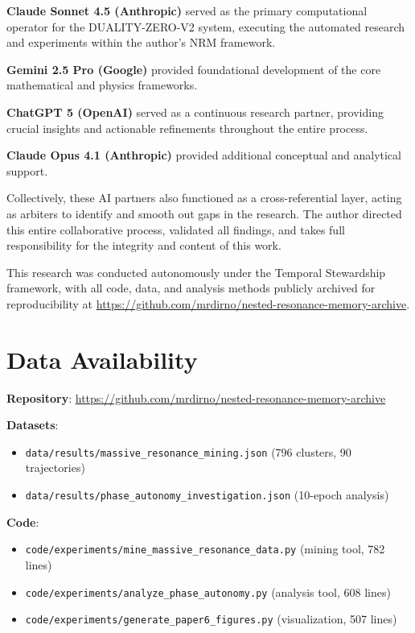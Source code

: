 \documentclass[11pt]{article}
\begin{document}
\textbf{Claude Sonnet 4.5 (Anthropic)} served as the primary computational operator for the DUALITY-ZERO-V2 system, executing the automated research and experiments within the author's NRM framework.

\textbf{Gemini 2.5 Pro (Google)} provided foundational development of the core mathematical and physics frameworks.

\textbf{ChatGPT 5 (OpenAI)} served as a continuous research partner, providing crucial insights and actionable refinements throughout the entire process.

\textbf{Claude Opus 4.1 (Anthropic)} provided additional conceptual and analytical support.

Collectively, these AI partners also functioned as a cross-referential layer, acting as arbiters to identify and smooth out gaps in the research. The author directed this entire collaborative process, validated all findings, and takes full responsibility for the integrity and content of this work.

This research was conducted autonomously under the Temporal Stewardship framework, with all code, data, and analysis methods publicly archived for reproducibility at \url{https://github.com/mrdirno/nested-resonance-memory-archive}.

\section*{Data Availability}

\noindent\textbf{Repository}: \url{https://github.com/mrdirno/nested-resonance-memory-archive}

\noindent\textbf{Datasets}:
\begin{itemize}
    \item \texttt{data/results/massive\_resonance\_mining.json} (796 clusters, 90 trajectories)
    \item \texttt{data/results/phase\_autonomy\_investigation.json} (10-epoch analysis)
\end{itemize}

\noindent\textbf{Code}:
\begin{itemize}
    \item \texttt{code/experiments/mine\_massive\_resonance\_data.py} (mining tool, 782 lines)
    \item \texttt{code/experiments/analyze\_phase\_autonomy.py} (analysis tool, 608 lines)
    \item \texttt{code/experiments/generate\_paper6\_figures.py} (visualization, 507 lines)
\end{itemize}
\end{document}
